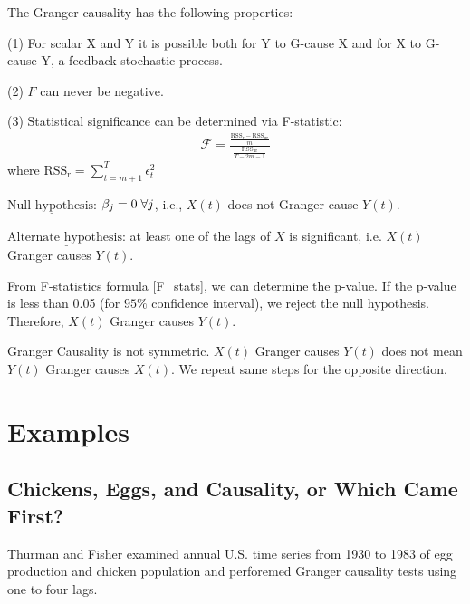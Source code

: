 \documentclass[]{article}
\begin{document}
The Granger causality has the following properties: 

(1) For scalar X and Y it is possible both for Y to G-cause X and for X to G-cause Y, a feedback stochastic process.

(2) $F$ can never be negative.

(3) Statistical significance can be determined via F-statistic:
\begin{align}
	\mathcal{F} = \frac{\frac{\text{RSS}_\text{r} - \text{RSS}_\text{ur}}{m}}{\frac{\text{RSS}_\text{ur}}{T - 2m - 1}}
	\label{F_stats}
\end{align}
where $\text{RSS}_\text{r} = \sum_{t = m + 1}^T \epsilon_t^2$

$\underline{\text{Null hypothesis:}}$ $\beta_j = 0 \hspace{1mm} \forall j$, i.e., $X(t)$ does not Granger cause $Y(t)$.

$\underline{\text{Alternate hypothesis:}}$ at least one of the lags of $X$ is significant, i.e. $X(t)$ Granger causes $Y(t)$.

From F-statistics formula \ref{F_stats}, we can determine the p-value. If the p-value is less than 0.05 (for $95 \%$ confidence interval), we reject the null hypothesis. Therefore, $X(t)$ Granger causes $Y(t)$.

Granger Causality is not symmetric. $X(t)$ Granger causes $Y(t)$ does not mean $Y(t)$ Granger causes $X(t)$. We repeat same steps for the opposite direction.

\section{Examples}

\subsection{Chickens, Eggs, and Causality, or Which Came First?}

Thurman and Fisher examined annual U.S. time series from 1930 to 1983 of egg production and chicken population and perforemed  Granger causality tests using one to four lags.
\end{document}
